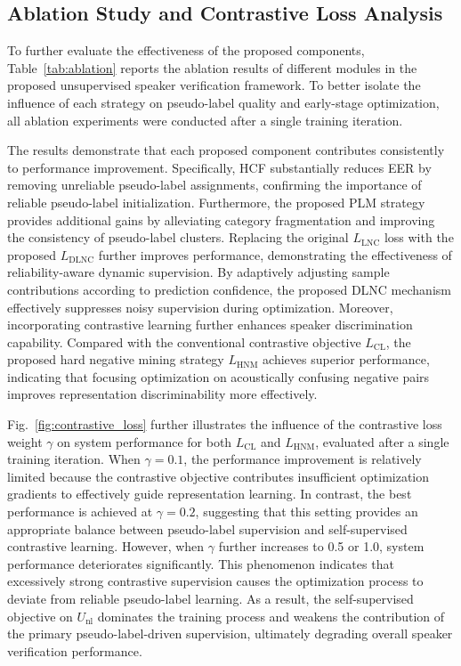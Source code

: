 \documentclass[lettersize,journal]{IEEEtran}
\begin{document}
\subsection{Ablation Study and Contrastive Loss Analysis}

To further evaluate the effectiveness of the proposed components, Table~\ref{tab:ablation} reports the ablation results of different modules in the proposed unsupervised speaker verification framework. To better isolate the influence of each strategy on pseudo-label quality and early-stage optimization, all ablation experiments were conducted after a single training iteration.

The results demonstrate that each proposed component contributes consistently to performance improvement. Specifically, HCF substantially reduces EER by removing unreliable pseudo-label assignments, confirming the importance of reliable pseudo-label initialization. Furthermore, the proposed PLM strategy provides additional gains by alleviating category fragmentation and improving the consistency of pseudo-label clusters. Replacing the original $L_{\mathrm{LNC}}$ loss with the proposed $L_{\mathrm{DLNC}}$ further improves performance, demonstrating the effectiveness of reliability-aware dynamic supervision. By adaptively adjusting sample contributions according to prediction confidence, the proposed DLNC mechanism effectively suppresses noisy supervision during optimization. Moreover, incorporating contrastive learning further enhances speaker  discrimination capability. Compared with the conventional contrastive objective $L_{\mathrm{CL}}$, the proposed hard negative mining strategy $L_{\mathrm{HNM}}$ achieves superior performance, indicating that focusing optimization on acoustically confusing negative pairs improves representation discriminability more effectively.

Fig.~\ref{fig:contrastive_loss} further illustrates the influence of the contrastive loss weight $\gamma$ on system performance for both $L_{\mathrm{CL}}$ and $L_{\mathrm{HNM}}$, evaluated after a single training iteration. When $\gamma=0.1$, the performance improvement is relatively limited because the contrastive objective contributes insufficient optimization gradients to effectively guide representation learning. In contrast, the best performance is achieved at $\gamma=0.2$, suggesting that this setting provides an appropriate balance between pseudo-label supervision and self-supervised contrastive learning. However, when $\gamma$ further increases to 0.5 or 1.0, system performance deteriorates significantly. This phenomenon indicates that excessively strong contrastive supervision causes the optimization process to deviate from reliable pseudo-label learning. As a result, the self-supervised objective on $U_{\mathrm{nl}}$ dominates the training process and weakens the contribution of the primary pseudo-label-driven supervision, ultimately degrading overall speaker verification performance.
\end{document}
